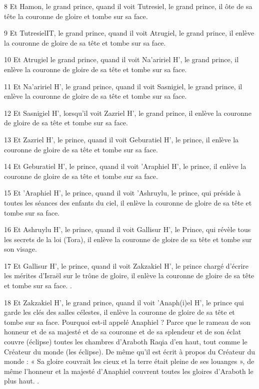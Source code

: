 \par 8 Et Hamon, le grand prince, quand il voit Tutresiel, le grand prince, il ôte de sa tête la couronne de gloire et tombe sur sa face.

\par 9 Et TutresielIT, le grand prince, quand il voit Atrugiel, le grand prince, il enlève la couronne de gloire de sa tête et tombe sur sa face.

\par 10 Et Atrugiel le grand prince, quand il voit Na'aririel H', le grand prince, il enlève la couronne de gloire de sa tête et tombe sur sa face.

\par 11 Et Na'aririel H', le grand prince, quand il voit Sasnigiel, le grand prince, il enlève la couronne de gloire de sa tête et tombe sur sa face.

\par 12 Et Sasnigiel H', lorsqu'il voit Zazriel H', le grand prince, il enlève la couronne de gloire de sa tête et tombe sur sa face.

\par 13 Et Zazriel H', le prince, quand il voit Geburatiel H', le prince, il enlève la couronne de gloire de sa tête et tombe sur sa face.

\par 14 Et Geburatiel H', le prince, quand il voit 'Araphiel H', le prince, il enlève la couronne de gloire de sa tête et tombe sur sa face.

\par 15 Et 'Araphiel H', le prince, quand il voit 'Ashruylu, le prince, qui préside à toutes les séances des enfants du ciel, il enlève la couronne de gloire de sa tête et tombe sur sa face.

\par 16 Et Ashruylu H', le prince, quand il voit Gallisur H', le Prince, qui révèle tous les secrets de la loi (Tora), il enlève la couronne de gloire de sa tête et tombe sur son visage.

\par 17 Et Gallisur H', le prince, quand il voit Zakzakiel H', le prince chargé d'écrire les mérites d'Israël sur le trône de gloire, il enlève la couronne de gloire de sa tête et tombe sur sa face. .

\par 18 Et Zakzakiel H', le grand prince, quand il voit 'Anaph(i)el H', le prince qui garde les clés des salles célestes, il enlève la couronne de gloire de sa tête et tombe sur sa face. Pourquoi est-il appelé Anaphiel ? Parce que le rameau de son honneur et de sa majesté et de sa couronne et de sa splendeur et de son éclat couvre (éclipse) toutes les chambres d'Araboth Raqia d'en haut, tout comme le Créateur du monde (les éclipse). De même qu'il est écrit à propos du Créateur du monde : « Sa gloire couvrait les cieux et la terre était pleine de ses louanges », de même l'honneur et la majesté d'Anaphiel couvrent toutes les gloires d'Araboth le plus haut. .

